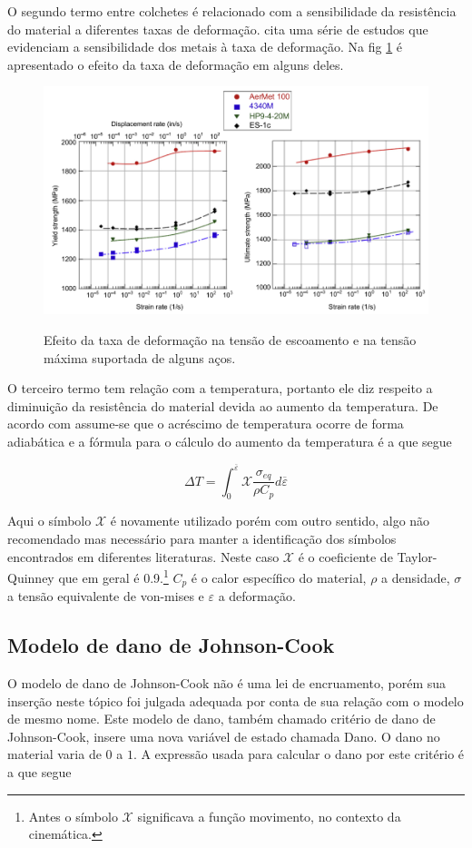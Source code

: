 O segundo termo entre colchetes é relacionado com a sensibilidade da resistência do material a diferentes taxas de deformação. \cite{Crouch} cita uma série de estudos que evidenciam a sensibilidade dos metais à taxa de deformação. Na fig \ref{fig:taxadef} é apresentado o efeito da taxa de deformação em alguns deles.

\begin{figure}[H]
    \centering
    \caption{Efeito da taxa de deformação na tensão de escoamento e na tensão máxima suportada de alguns aços.}
    \includegraphics[width=0.5\linewidth]{images/strainrateeffect.png} 
    \label{fig:taxadef}
\end{figure}

O terceiro termo tem relação com a temperatura, portanto ele diz respeito a diminuição da resistência do material devida ao aumento da temperatura. De acordo com \cite{Crouch} assume-se que o acréscimo de temperatura ocorre de forma adiabática e a fórmula para o cálculo do aumento da temperatura é a que segue

\begin{equation}
    \Delta T = \int_0^{\overline{\varepsilon}} \mathcal{X} \frac{\sigma_{eq}}{\rho C_p} d\overline{\varepsilon}
\end{equation}

Aqui o símbolo $ \mathcal{X}$ é novamente utilizado porém com outro sentido, algo não recomendado mas necessário para manter a identificação dos símbolos encontrados em diferentes literaturas. Neste caso $ \mathcal{X} $ é o coeficiente de Taylor-Quinney que em geral é 0.9.\footnote{Antes o símbolo $\mathcal{X}$ significava a função movimento, no contexto da cinemática.} $C_p$ é o calor específico do material, $ \rho $ a densidade, $ \sigma $ a tensão equivalente de von-mises e $ \varepsilon$ a deformação. 

\subsection{Modelo de dano de Johnson-Cook}

O modelo de dano de Johnson-Cook não é uma lei de encruamento, porém sua inserção neste tópico foi julgada adequada por conta de sua relação com o modelo de mesmo nome.
Este modelo de dano, também chamado critério de dano de Johnson-Cook, insere uma nova variável de estado chamada Dano. O dano no material varia de $ 0 $ a $ 1 $. A expressão usada para calcular o dano por este critério é a que segue

